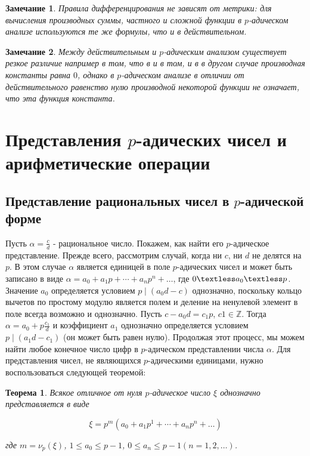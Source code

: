 \documentclass[master, och, diploma, times]{sty/SCWorks}
\theoremstyle{plain}
\newtheorem{thethm}{Теорема}
\newtheorem{note}{Замечание}
\theoremstyle{definition}
\begin{document}
\begin{note}
Правила дифференцирования не зависят от метрики: для вычисления производных суммы, частного и сложной функции в $p$-адическом анализе используются те же формулы, что и в действительном.
\end{note}

\begin{note}
Между действительным и $p$-адическим анализом существует резкое различие например в том, что в и в том, и в в другом случае производная константы равна $0$, однако в $p$-адическом анализе в отличии от действительного равенство нулю производной некоторой функции не означает, что эта функция константа.
\end{note}





\section{Представления $p$-адических чисел и арифметические операции}

\subsection{Представление рациональных чисел в $p$-адической форме}
Пусть $\alpha=\frac{c}{d}$ - рациональное число. Покажем, как найти его $p$-адическое представление. Прежде всего, рассмотрим случай, когда ни $c$, ни $d$ не делятся на $p$. В этом случае $\alpha$ является единицей в поле $p$-адических чисел и может быть записано в виде $\alpha=a_0+a_1p+\cdots+a_np^n+\dots $, где $0 \textless a_0 \textless p$. Значение $a_0$ определяется условием $p \mid (a_0d-c)$ однозначно, поскольку кольцо вычетов по простому модулю является полем и деление на ненулевой элемент в поле всегда возможно и однозначно. Пусть $c-a_0d=c_1p$, $c1 \in \mathbb{Z}$. Тогда $\alpha=a_0+p\frac{c_1}{d}$ и коэффициент $a_1$ однозначно определяется условием $p \mid (a_1d-c_1)$ (он может быть равен нулю). Продолжая этот процесс, мы можем найти любое конечное число цифр в $p$-адическом представлении числа $\alpha$. Для представления чисел, не являющихся $p$-адическими единицами, нужно воспользоваться следующей теоремой:

\begin{thethm}
Всякое отличное от нуля $p$-адическое число $\xi$ однозначно представляется в виде

$$
\xi=p^m(a_0+a_1p^1+\cdots+a_np^n+\dots)
$$

\noindent где $m=\nu_p(\xi)$, $1 \le a_0 \le p-1$, $0 \le a_n \le p-1$$(n=1,2,\dots)$.
\end{thethm}
\end{document}
